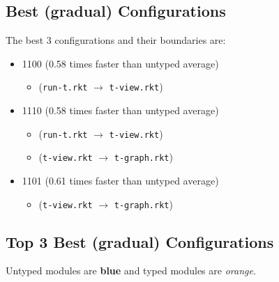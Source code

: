 \documentclass{article}
\newcommand{\mono}[1]{\texttt{#1}}
\begin{document}
\subsection{Best (gradual) Configurations}
The best 3 configurations and their boundaries are:
\begin{itemize}
\item 1100 (0.58 times faster than untyped average)
  \begin{itemize}
  \item (\mono{run-t.rkt} $\rightarrow$ \mono{t-view.rkt})
  \end{itemize}
\item 1110 (0.58 times faster than untyped average)
  \begin{itemize}
  \item (\mono{run-t.rkt} $\rightarrow$ \mono{t-view.rkt})
  \item (\mono{t-view.rkt} $\rightarrow$ \mono{t-graph.rkt})
  \end{itemize}
\item 1101 (0.61 times faster than untyped average)
  \begin{itemize}
  \item (\mono{t-view.rkt} $\rightarrow$ \mono{t-graph.rkt})
  \end{itemize}
\end{itemize}

\subsection{Top 3 Best (gradual) Configurations}
Untyped modules are \textbf{blue} and typed modules are \emph{orange}.
\end{document}

